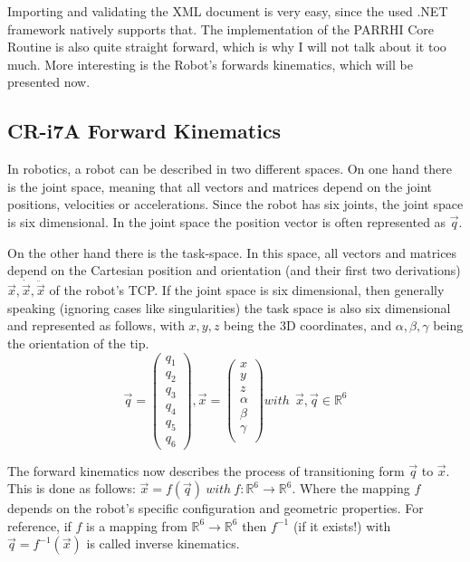 Importing and validating the XML document is very easy, since the used .NET framework natively supports that. The implementation of the PARRHI Core Routine is also quite straight forward, which is why I will not talk about it too much. More interesting is the Robot's forwards kinematics, which will be presented now.

\subsection{CR-i7A Forward Kinematics}
In robotics, a robot can be described in two different spaces. On one hand there is the joint space, meaning that all vectors and matrices depend on the joint positions, velocities or accelerations. Since the robot has six joints, the joint space is six dimensional. In the joint space the position vector is often represented as $ \vec{q} $.

On the other hand there is the task-space. In this space, all vectors and matrices depend on the Cartesian position and orientation (and their first two derivations) $ \vec{x}, \dot{\vec{x}}, \ddot{\vec{x}} $ of the robot's TCP. If the joint space is six dimensional, then generally speaking (ignoring cases like singularities) the task space is also six dimensional and represented as follows, with $x,y,z$ being the 3D coordinates, and $\alpha, \beta, \gamma $ being the orientation of the tip.
\[ \vec{q} = \begin{pmatrix} q_1 \\ q_2 \\ q_3 \\ q_4 \\ q_5 \\ q_6 \end{pmatrix}, \vec{x} = \begin{pmatrix} x \\ y \\ z \\ \alpha \\ \beta \\ \gamma \\ \end{pmatrix} with~~\vec{x},\vec{q} \in \mathbb{R}^6  \]

The forward kinematics now describes the process of transitioning form $ \vec{q} $ to $ \vec{x} $. This is done as follows: $ \vec{x} = f(\vec{q})~with~f: \mathbb{R}^6 \rightarrow \mathbb{R}^6$. Where the mapping $f$ depends on the robot's specific configuration and geometric properties. For reference, if $f$ is a mapping from $\mathbb{R}^6 \rightarrow \mathbb{R}^6$ then $f^{-1}$ (if it exists!) with $ \vec{q} = f^{-1}(\vec{x})$ is called inverse kinematics. 

